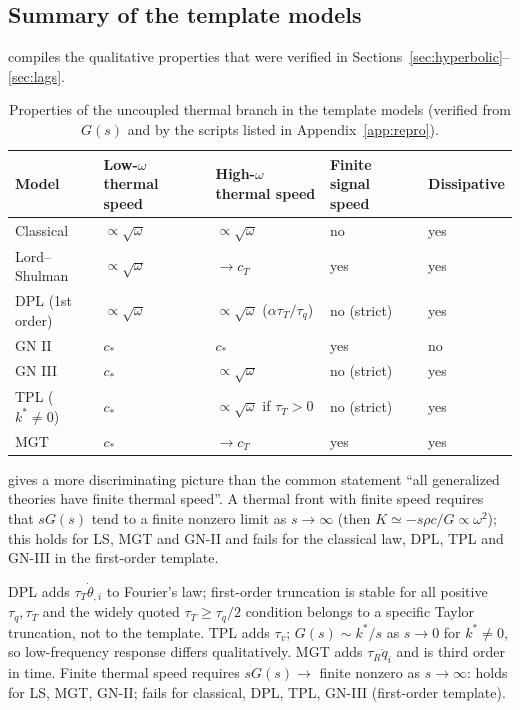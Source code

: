 \subsection{Summary of the template models}
 compiles the qualitative properties that were verified in Sections~\ref{sec:hyperbolic}--\ref{sec:lags}.
\begin{table}[t]\centering\small
\caption{Properties of the uncoupled thermal branch in the template models (verified from $G(s)$ and by the scripts listed in Appendix~\ref{app:repro}).}\label{tab:compare}
\begin{tabular}{@{}p{3.2cm}p{2.3cm}p{2.3cm}p{2.3cm}p{2.6cm}@{}}\toprule
Model & Low-$\omega$ thermal speed & High-$\omega$ thermal speed & Finite signal speed & Dissipative\\\midrule
Classical & $\propto\sqrt{\omega}$ & $\propto\sqrt{\omega}$ & no & yes\\
Lord--Shulman & $\propto\sqrt{\omega}$ & $\to c_T$ & yes & yes\\
DPL (1st order) & $\propto\sqrt{\omega}$ & $\propto\sqrt{\omega}$ ($\alpha\tau_T/\tau_q$) & no (strict) & yes\\
GN II & $c_*$ & $c_*$ & yes & no\\
GN III & $c_*$ & $\propto\sqrt{\omega}$ & no (strict) & yes\\
TPL ($k^*\neq0$) & $c_*$ & $\propto\sqrt{\omega}$ if $\tau_T>0$ & no (strict) & yes\\
MGT & $c_*$ & $\to c_T$ & yes & yes\\\bottomrule
\end{tabular}
\end{table}
 gives a more discriminating picture than the common statement ``all generalized theories have finite thermal speed''. A thermal front with finite speed requires that $sG(s)$ tend to a finite nonzero limit as $s\to\infty$ (then $K\simeq-s\rho c/G\propto\omega^2$); this holds for LS, MGT and GN-II and fails for the classical law, DPL, TPL and GN-III in the first-order template.


\begin{summarybox}[Summary]
DPL adds $\tau_T\dot\theta_{,i}$ to Fourier's law; first-order truncation is stable for all positive $\tau_q,\tau_T$ and the widely quoted $\tau_T\ge\tau_q/2$ condition belongs to a specific Taylor truncation, not to the template. TPL adds $\tau_v$; $G(s)\sim k^*/s$ as $s\to0$ for $k^*\ne0$, so low-frequency response differs qualitatively. MGT adds $\tau_R\ddot q_i$ and is third order in time. Finite thermal speed requires $sG(s)\to$ finite nonzero as $s\to\infty$: holds for LS, MGT, GN-II; fails for classical, DPL, TPL, GN-III (first-order template).
\end{summarybox}